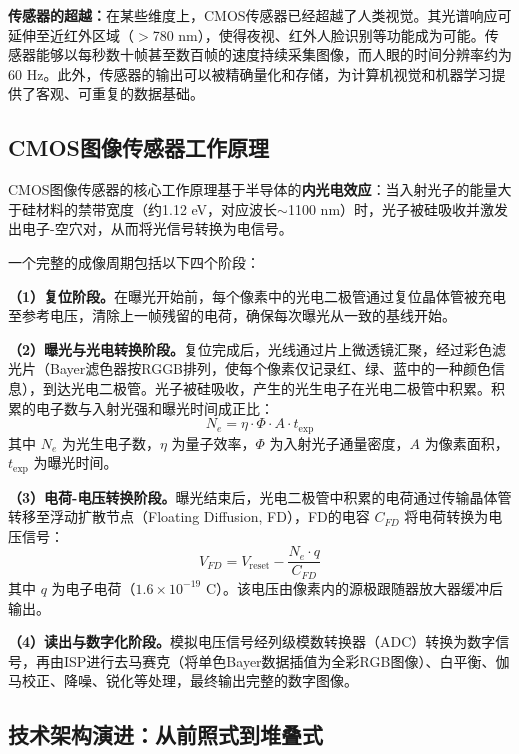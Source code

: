 \documentclass[12pt, a4paper]{ctexart}
\begin{document}
\textbf{传感器的超越：}在某些维度上，CMOS传感器已经超越了人类视觉。其光谱响应可延伸至近红外区域（$>$780 nm），使得夜视、红外人脸识别等功能成为可能。传感器能够以每秒数十帧甚至数百帧的速度持续采集图像，而人眼的时间分辨率约为60 Hz。此外，传感器的输出可以被精确量化和存储，为计算机视觉和机器学习提供了客观、可重复的数据基础。

\subsection{CMOS图像传感器工作原理}

CMOS图像传感器的核心工作原理基于半导体的\textbf{内光电效应}\cite{fossum1997,baidu_cmos}：当入射光子的能量大于硅材料的禁带宽度（约1.12 eV，对应波长$\sim$1100 nm）时，光子被硅吸收并激发出电子-空穴对，从而将光信号转换为电信号。

一个完整的成像周期包括以下四个阶段：

\textbf{（1）复位阶段。}在曝光开始前，每个像素中的光电二极管通过复位晶体管被充电至参考电压，清除上一帧残留的电荷，确保每次曝光从一致的基线开始。

\textbf{（2）曝光与光电转换阶段。}复位完成后，光线通过片上微透镜汇聚，经过彩色滤光片（Bayer滤色器按RGGB排列，使每个像素仅记录红、绿、蓝中的一种颜色信息），到达光电二极管。光子被硅吸收，产生的光生电子在光电二极管中积累。积累的电子数与入射光强和曝光时间成正比：
\begin{equation}
    N_e = \eta \cdot \Phi \cdot A \cdot t_{\text{exp}}
\end{equation}
其中 $N_e$ 为光生电子数，$\eta$ 为量子效率，$\Phi$ 为入射光子通量密度，$A$ 为像素面积，$t_{\text{exp}}$ 为曝光时间。

\textbf{（3）电荷-电压转换阶段。}曝光结束后，光电二极管中积累的电荷通过传输晶体管转移至浮动扩散节点（Floating Diffusion, FD），FD的电容 $C_{FD}$ 将电荷转换为电压信号：
\begin{equation}
    V_{FD} = V_{\text{reset}} - \frac{N_e \cdot q}{C_{FD}}
\end{equation}
其中 $q$ 为电子电荷（$1.6 \times 10^{-19}$ C）。该电压由像素内的源极跟随器放大器缓冲后输出。

\textbf{（4）读出与数字化阶段。}模拟电压信号经列级模数转换器（ADC）转换为数字信号，再由ISP进行去马赛克（将单色Bayer数据插值为全彩RGB图像）、白平衡、伽马校正、降噪、锐化等处理，最终输出完整的数字图像。

\subsection{技术架构演进：从前照式到堆叠式}
\end{document}
